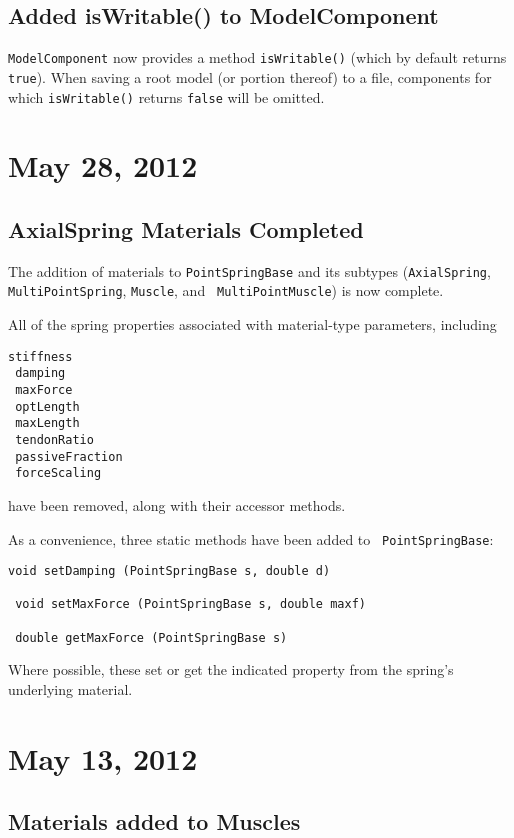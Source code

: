 \documentclass{article}
\begin{document}
\subsection*{Added isWritable() to ModelComponent}

{\tt ModelComponent} now provides a method {\tt isWritable()} (which
by default returns {\tt true}). When saving a root model (or portion
thereof) to a file, components for which {\tt isWritable()} returns
{\tt false} will be omitted.

\section*{May 28, 2012}

\subsection*{AxialSpring Materials Completed}

The addition of materials to {\tt PointSpringBase} and its subtypes
({\tt AxialSpring}, {\tt MultiPointSpring}, {\tt Muscle}, and {\tt
MultiPointMuscle}) is now complete.

All of the spring properties associated with material-type
parameters, including
\begin{lstlisting}[]
 stiffness
 damping
 maxForce
 optLength
 maxLength
 tendonRatio
 passiveFraction
 forceScaling
\end{lstlisting}
have been removed, along with their accessor methods.

As a convenience, three static methods have been added to {\tt
PointSpringBase}:
\begin{lstlisting}[]
 void setDamping (PointSpringBase s, double d)

 void setMaxForce (PointSpringBase s, double maxf)

 double getMaxForce (PointSpringBase s)
\end{lstlisting}
Where possible, these set or get the indicated property from
the spring's underlying material.

\section*{May 13, 2012}

\subsection*{Materials added to Muscles}
\end{document}
